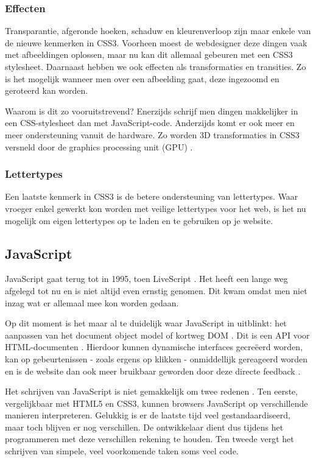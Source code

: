 \subsubsection{Effecten}
Transparantie, afgeronde hoeken, schaduw en kleurenverloop zijn maar enkele van de nieuwe kenmerken in CSS3. Voorheen moest de webdesigner deze dingen vaak met afbeeldingen oplossen, maar nu kan dit allemaal gebeuren met een CSS3 stylesheet. Daarnaast hebben we ook effecten als transformaties en transities. Zo is het mogelijk wanneer men over een afbeelding gaat, deze ingezoomd en geroteerd kan worden. 

Waarom is dit zo vooruitstrevend? Enerzijds schrijf men dingen makkelijker in een CSS-stylesheet dan met JavaScript-code. Anderzijds komt er ook meer en meer ondersteuning vanuit de hardware. Zo worden 3D transformaties in CSS3 versneld door de graphics processing unit (GPU) \cite{Hales2012,Kool2012}.

\subsubsection{Lettertypes}
Een laatste kenmerk in CSS3 is de betere ondersteuning van lettertypes. Waar vroeger enkel gewerkt kon worden met veilige lettertypes voor het web, is het nu mogelijk om eigen lettertypes op te laden en te gebruiken op je website.

\subsection{JavaScript}
\label{ref:javascript}
JavaScript gaat terug tot in 1995, toen LiveScript \cite{McFarland2011}. Het heeft een lange weg afgelegd tot nu en is niet altijd even ernstig genomen. Dit kwam omdat men niet inzag wat er allemaal mee kon worden gedaan. 

Op dit moment is het maar al te duidelijk waar JavaScript in uitblinkt: het aanpassen van het document object model of kortweg DOM \cite{PhilDutson2012}. Dit is een API voor HTML-documenten \cite{Hegaret2004}. Hierdoor kunnen dynamische interfaces gecreëerd worden, kan op gebeurtenissen - zoals ergens op klikken - onmiddellijk gereageerd worden en is de website dan ook meer bruikbaar geworden door deze directe feedback \cite{McFarland2011}.

Het schrijven van JavaScript is niet gemakkelijk om twee redenen \cite{McFarland2011}. Ten eerste, vergelijkbaar met HTML5 en CSS3, kunnen browsers JavaScript op verschillende manieren interpreteren. Gelukkig is er de laatste tijd veel gestandaardiseerd, maar toch blijven er nog verschillen. De ontwikkelaar dient dus tijdens het programmeren met deze verschillen rekening te houden. Ten tweede vergt het schrijven van simpele, veel voorkomende taken soms veel code.

